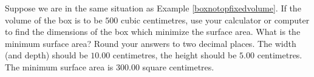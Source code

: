 {Suppose we are in the same situation as Example \ref{boxnotopfixedvolume}.  If the volume of the box is to be $500$ cubic centimetres, use your calculator or computer to find the dimensions of the box which minimize the surface area.  What is the minimum surface area?  Round your answers to two decimal places.}
{The width (and depth) should be $10.00$ centimetres, the height should be $5.00$ centimetres.  The minimum surface area is $300.00$ square centimetres.}